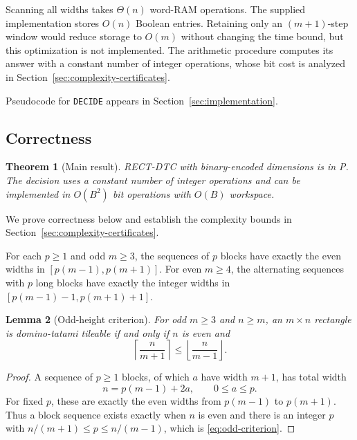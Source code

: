 \documentclass[11pt, reqno]{amsart}
\newtheorem{theorem}{Theorem}[section]
\newtheorem{lemma}[theorem]{Lemma}
\theoremstyle{definition}
\theoremstyle{remark}
\numberwithin{equation}{section}
\begin{document}
Scanning all widths takes $\Theta(n)$ word-RAM operations. The supplied
implementation stores $O(n)$ Boolean entries. Retaining only an
$(m+1)$-step window would reduce storage to $O(m)$ without changing the
time bound, but this optimization is not implemented. The arithmetic
procedure computes its answer with a constant
number of integer operations, whose bit cost is analyzed in
Section~\ref{sec:complexity-certificates}.

Pseudocode for \texttt{DECIDE} appears in
Section~\ref{sec:implementation}.

\subsection{Correctness}
\label{sec:correctness}

\begin{theorem}[Main result]
    \label{thm:main}
    RECT-DTC with binary-encoded dimensions is in P. The decision uses
    a constant number of integer operations and can be implemented in
    $O(B^2)$ bit operations with $O(B)$ workspace.
\end{theorem}

We prove correctness below and establish the complexity bounds in
Section~\ref{sec:complexity-certificates}.

For each $p\ge1$ and odd $m\ge3$, the sequences of $p$ blocks have
exactly the even widths in $[p(m-1),p(m+1)]$. For even $m\ge4$,
the alternating sequences with $p$ long blocks have exactly the
integer widths in $[p(m-1)-1,p(m+1)+1]$.

\begin{lemma}[Odd-height criterion]
    \label{lem:odd-criterion}
    For odd $m\ge3$ and $n\ge m$, an $m\times n$ rectangle is
    domino-tatami tileable if and only if $n$ is even and
    \begin{equation}
        \label{eq:odd-criterion}
        \left\lceil\frac{n}{m+1}\right\rceil
        \le
        \left\lfloor\frac{n}{m-1}\right\rfloor.
    \end{equation}
\end{lemma}

\begin{proof}
    A sequence of $p\ge1$ blocks, of which $a$ have width $m+1$,
    has total width
    \[
        n=p(m-1)+2a,\qquad 0\le a\le p.
    \]
    For fixed $p$, these are exactly the even widths from $p(m-1)$
    to $p(m+1)$. Thus a block sequence exists exactly when $n$ is even
    and there is an integer $p$ with
    $n/(m+1)\le p\le n/(m-1)$, which is
    \eqref{eq:odd-criterion}.
\end{proof}
\end{document}
